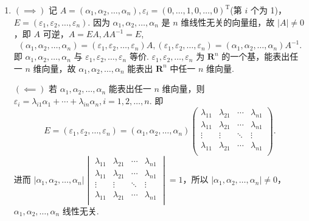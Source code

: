 \begin{enumerate}
    \item $(\implies)$ 记 $A = (\alpha_1, \alpha_2, \ldots, \alpha_n), \varepsilon_i = (0, \ldots, 1, 0, \ldots, 0)^{\mathrm{T}}$(第 $i$ 个为 1)，$E = (\varepsilon_1, \varepsilon_2, \ldots, \varepsilon_n)$. 因为 $\alpha_1, \alpha_2, \ldots, \alpha_n$ 是 $n$ 维线性无关的向量组，故 $\lvert A \rvert \neq 0$，即 $A$ 可逆，$A = EA, AA^{-1} = E$,\[(\alpha_1, \alpha_2, \ldots, \alpha_n) = (\varepsilon_1, \varepsilon_2, \ldots, \varepsilon_n)A, (\varepsilon_1, \varepsilon_2, \ldots, \varepsilon_n) = (\alpha_1, \alpha_2, \ldots, \alpha_n)A^{-1}.\] 即 $\alpha_1, \alpha_2, \ldots, \alpha_n$ 与 $\varepsilon_1, \varepsilon_2, \ldots, \varepsilon_n$ 等价. $\varepsilon_1, \varepsilon_2, \ldots, \varepsilon_n$ 为 $\mathbf{R}^n$ 的一个基，能表出任一 $n$ 维向量，故 $\alpha_1, \alpha_2, \ldots, \alpha_n$ 能表出 $\mathbf{R}^n$ 中任一 $n$ 维向量.

          $(\impliedby)$ 若 $\alpha_1, \alpha_2, \ldots, \alpha_n$ 能表出任一 $n$ 维向量，则 $\varepsilon_i = \lambda_{i1}\alpha_1+\cdots+\lambda_{in}\alpha_n, i = 1, 2, \ldots, n$. 即
          \[E = (\varepsilon_1, \varepsilon_2, \ldots, \varepsilon_n) = (\alpha_1, \alpha_2, \ldots, \alpha_n)\begin{pmatrix}
                  \lambda_{11} & \lambda_{21} & \cdots & \lambda_{n1} \\
                  \lambda_{11} & \lambda_{21} & \cdots & \lambda_{n1} \\
                  \vdots       & \vdots       & \ddots & \vdots       \\
                  \lambda_{11} & \lambda_{21} & \cdots & \lambda_{n1} \\
              \end{pmatrix}.\]
          进而 $\lvert \alpha_1, \alpha_2, \ldots, \alpha_n \rvert \begin{vmatrix}
                  \lambda_{11} & \lambda_{21} & \cdots & \lambda_{n1} \\
                  \lambda_{11} & \lambda_{21} & \cdots & \lambda_{n1} \\
                  \vdots       & \vdots       & \ddots & \vdots       \\
                  \lambda_{11} & \lambda_{21} & \cdots & \lambda_{n1} \\
              \end{vmatrix} = 1$，所以 $\lvert \alpha_1, \alpha_2, \ldots, \alpha_n \rvert \neq 0$，$\alpha_1, \alpha_2, \ldots, \alpha_n$ 线性无关.


\end{enumerate}
